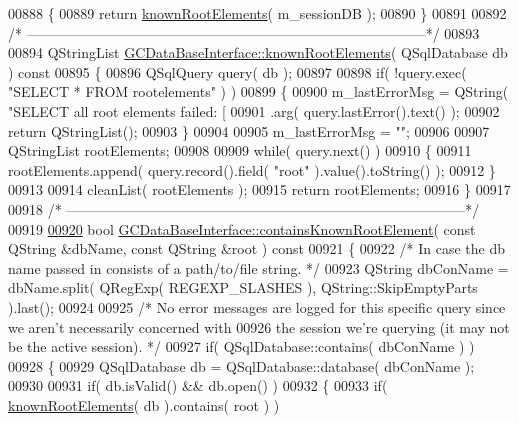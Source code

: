 \begin{DoxyCode}
{{{{{{{{{{{{{{{{{{{{{{{{{{{{{{{{{00888 \textcolor{keyword}{}\{
00889   \textcolor{keywordflow}{return} \hyperlink{class_g_c_data_base_interface_ac5c57277f9476ab74cfe13fbcee52f15}{knownRootElements}( m\_sessionDB );
00890 \}
00891 
00892 \textcolor{comment}{/*
      --------------------------------------------------------------------------------------*/}
00893 
00894 QStringList \hyperlink{class_g_c_data_base_interface_ac5c57277f9476ab74cfe13fbcee52f15}{GCDataBaseInterface::knownRootElements}( QSqlDatabase db )\textcolor{keyword}{ const}
00895 \textcolor{keyword}{}\{
00896   QSqlQuery query( db );
00897 
00898   \textcolor{keywordflow}{if}( !query.exec( \textcolor{stringliteral}{"SELECT * FROM rootelements"} ) )
00899   \{
00900     m\_lastErrorMsg = QString( \textcolor{stringliteral}{"SELECT all root elements failed: [%
00901         .arg( query.lastError().text() );
00902     \textcolor{keywordflow}{return} QStringList();
00903   \}
00904 
00905   m\_lastErrorMsg = \textcolor{stringliteral}{""};
00906 
00907   QStringList rootElements;
00908 
00909   \textcolor{keywordflow}{while}( query.next() )
00910   \{
00911     rootElements.append( query.record().field( \textcolor{stringliteral}{"root"} ).value().toString() );
00912   \}
00913 
00914   cleanList( rootElements );
00915   \textcolor{keywordflow}{return} rootElements;
00916 \}
00917 
00918 \textcolor{comment}{/*
      --------------------------------------------------------------------------------------*/}
00919 
\hypertarget{gcdatabaseinterface_8cpp_source_l00920}{}\hyperlink{class_g_c_data_base_interface_a91183c2d227bf90d0d26fccc1e4ae878}{00920} \textcolor{keywordtype}{bool} \hyperlink{class_g_c_data_base_interface_a91183c2d227bf90d0d26fccc1e4ae878}{GCDataBaseInterface::containsKnownRootElement}( \textcolor{keyword}{const} QString &dbName, \textcolor{keyword}{
      const} QString &root )\textcolor{keyword}{ const}
00921 \textcolor{keyword}{}\{
00922   \textcolor{comment}{/* In case the db name passed in consists of a path/to/file string. */}
00923   QString dbConName = dbName.split( QRegExp( REGEXP\_SLASHES ), 
      QString::SkipEmptyParts ).last();
00924 
00925   \textcolor{comment}{/* No error messages are logged for this specific query since we aren't
       necessarily concerned with}
00926 \textcolor{comment}{    the session we're querying (it may not be the active session). */}
00927   \textcolor{keywordflow}{if}( QSqlDatabase::contains( dbConName ) )
00928   \{
00929     QSqlDatabase db = QSqlDatabase::database( dbConName );
00930 
00931     \textcolor{keywordflow}{if}( db.isValid() && db.open() )
00932     \{
00933       \textcolor{keywordflow}{if}( \hyperlink{class_g_c_data_base_interface_ac5c57277f9476ab74cfe13fbcee52f15}{knownRootElements}( db ).contains( root ) )
}}}}}}}}}}}}}}}}}}}}}}}}}}}}}}}}}}
\end{DoxyCode}
